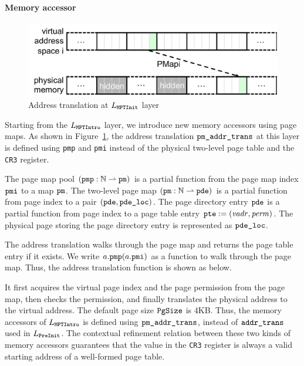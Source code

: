 \paragraph{Memory accessor}

\begin{figure}[t]\centering
\includegraphics[scale=.55]{figs/mem_model_2} 
\caption{Address translation at $L_\code{MPTInit}$ layer}
\label{fig:seq:mem2}
\hrulefill
\end{figure}

Starting from the $L_\code{MPTIntro}$ layer, we 
introduce new memory accessors
using page maps.
As shown in Figure~\ref{fig:seq:mem2},
the
address translation $\code{pm\_addr\_trans}$ at this layer is defined
using \verb"pmp" and \verb"pmi" instead of the physical two-level page
table and the \verb"CR3" register. 

The page map pool $(\code{pmp}: \integer\partialf \code{pm})$
is a partial function from the page map index $\code{pmi}$
to a map $\code{pm}$.
The  two-level page map $(\code{pm} : \integer\partialf \code{pde})$
is a partial function  from page index to a pair 
$(\code{pde}, \code{pde\_loc})$.
The page directory entry 
$\code{pde}$
is a partial function from page index to a page table entry
$\code{pte}:=(\mathit{vadr}, \mathit{perm})$.
The physical page storing
the page directory entry is represented
as $\code{pde\_loc}$.

The address translation walks through
the page map and returns the page table entry if it exists.
We write $a.\code{pmp}(a.\code{pmi})$ as a function to walk
through the page map.
Thus, the address translation function is shown as below.
\begin{mathpar}
\end{mathpar}
It first acquires the virtual page index and the page permission
from the page map,
then checks the permission,
and finally translates the physical address
to the virtual address.
The default page size $\code{PgSize}$ is 4KB.
Thus, the memory accessors of $L_\code{MPTIntro}$ is defined
using $\code{pm\_addr\_trans}$, instead of
$\code{addr\_trans}$ used in $L_\code{PreInit}$.
 The contextual refinement relation
between these two kinds of memory accessors guarantees that the
value in the \verb"CR3" register is always a valid starting address of
a well-formed page table.




